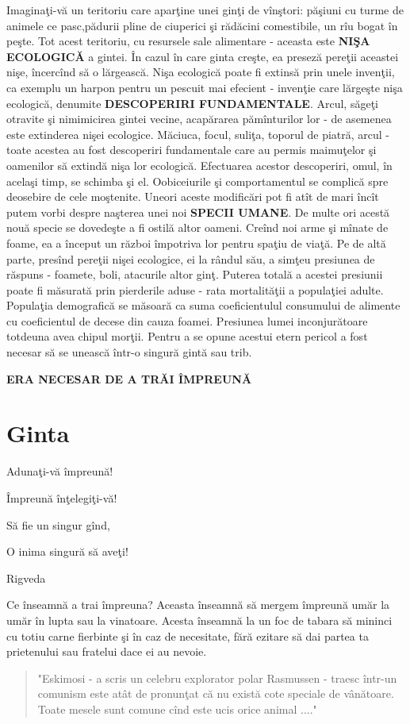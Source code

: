 Imaginaţi-vă un teritoriu care aparţine unei ginţi de vînştori: păşiuni cu turme de animele ce pasc,pădurii pline de ciuperici şi rădăcini comestibile, un rîu bogat în peşte. Tot acest teritoriu, cu resursele sale alimentare - aceasta este  \textbf{NIŞA ECOLOGICĂ} a gintei. În cazul în care ginta creşte, ea preseză pereţii aceastei nişe, încercînd să o lărgească. Nişa ecologică poate fi extinsă prin unele invenţii, ca exemplu un harpon pentru un pescuit mai efecient  - invenţie care lărgeşte nişa ecologică, denumite \textbf{DESCOPERIRI FUNDAMENTALE}. Arcul, săgeţi otravite şi  nimimicirea gintei vecine, acapărarea pămînturilor lor  -  de asemenea este extinderea nişei ecologice. Măciuca, focul, suliţa, toporul de piatră, arcul - toate acestea au fost descoperiri fundamentale care au permis maimuţelor şi oamenilor să extindă nişa lor ecologică. Efectuarea acestor descoperiri, omul, în acelaşi timp, se schimba şi el. Oobiceiurile şi comportamentul  se complică spre deosebire de cele  moştenite. Uneori aceste modificări pot fi atît de mari încît putem vorbi despre naşterea unei noi \textbf{SPECII UMANE}. De multe ori acestă nouă specie se dovedeşte a fi ostilă altor oameni. Creînd noi arme şi mînate de foame, ea a început un război împotriva lor pentru spaţiu de viaţă. Pe de altă parte, presînd pereţii nişei ecologice, ei la rândul său, a simţeu presiunea de răspuns - foamete, boli,  atacurile altor ginţ. Puterea totală a acestei presiunii poate fi măsurată prin pierderile aduse - rata mortalităţii a populaţiei adulte. Populaţia demografică se măsoară ca suma coeficientulul consumului de alimente cu coeficientul de decese din cauza foamei. Presiunea lumei inconjurătoare totdeuna avea chipul morţii. Pentru a se opune acestui etern pericol  a fost necesar să se unească într-o singură gintă sau trib. 

\textbf{ERA NECESAR DE A TRĂI ÎMPREUNĂ}

\section{Ginta}
\epigraph{Adunaţi-vă împreună!

Împreună înţelegiţi-vă!

Să fie un singur gînd, 

O inima singură să aveţi!}{Rigveda}

Ce înseamnă a trai împreuna? Aceasta înseamnă să mergem împreună  umăr la umăr în lupta sau la vinatoare. Acesta înseamnă la un foc de tabara să mininci cu totiu carne fierbinte şi în caz de necesitate, fără ezitare să dai partea ta prietenului sau fratelui dace ei au nevoie. 
\begin{quote}
"Eskimosi - a scris un celebru explorator polar Rasmussen - traesc într-un comunism este atât de pronunţat că nu există cote speciale de vânătoare. Toate mesele sunt comune cînd este ucis orice animal ...." 
\end{quote}


